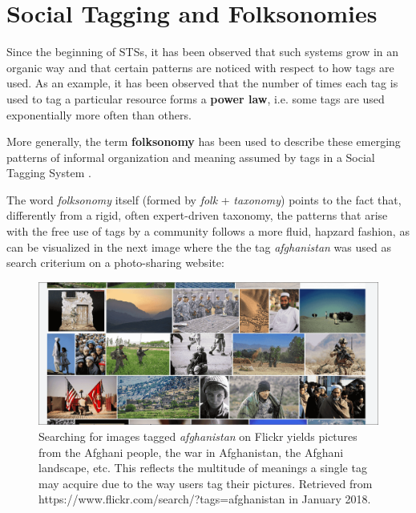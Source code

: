 \cite{wal_2005}

\section{Social Tagging and Folksonomies}

Since the beginning of STSs, it has been observed that such systems grow in an organic way and that certain patterns are noticed with respect to how tags are used. As an example, it has been observed \citep{halpin_etal_2006} that the number of times each tag is used to tag a particular resource forms a \textbf{power law}, i.e. some tags are used exponentially more often than others.

More generally, the term \textbf{folksonomy} has been used to describe  these emerging patterns of informal organization and meaning assumed by tags in a Social Tagging System \citep{mathes_2004,wal_2005_folksonomy}.

The word \textit{folksonomy} itself (formed by \textit{folk} + \textit{taxonomy}) points to the fact that, differently from a rigid, often expert-driven taxonomy, the patterns that arise with the free use of tags by a community follows a more fluid, hapzard fashion, as can be  visualized in the next image where the the tag \textit{afghanistan} was used as search criterium on a photo-sharing website: 

\begin{figure}[!h]
    \centering
    \includegraphics[width=\textwidth]{chapters/02_social_tagging/images/flickr_afghanistan.png}
    \caption{Searching for images tagged \textit{afghanistan} on Flickr yields pictures from the Afghani people, the war in Afghanistan, the Afghani landscape, etc. This reflects the multitude of meanings a single tag may acquire due to the way users tag their pictures. Retrieved from https://www.flickr.com/search/?tags=afghanistan in January 2018.}
    \label{fig:afghanistan}
\end{figure}


